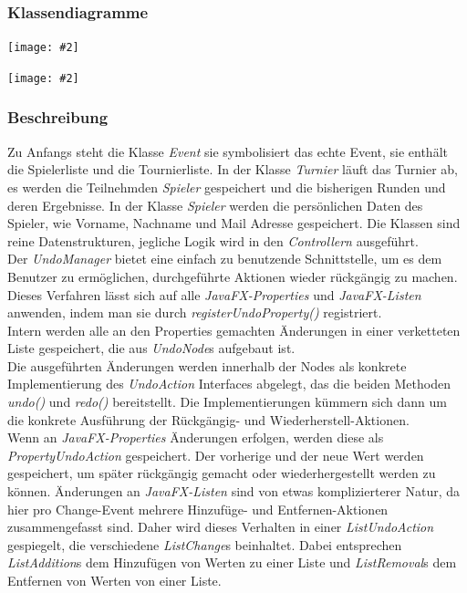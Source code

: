\documentclass[11pt]{article}
\newcommand{\includediagram}[2]{
	\begin{center}
		\texttt{[image: \#2]}
	\end{center}
}
\begin{document}
\subsubsection{Klassendiagramme}

\includediagram{1.0}{model-main.png}

\includediagram{1.0}{model-undo.png}

\subsubsection{Beschreibung}
Zu Anfangs steht die Klasse \textit{Event} sie symbolisiert das echte Event, sie enthält die Spielerliste und die Tournierliste. In der Klasse \textit{Turnier} läuft das Turnier ab, es werden die Teilnehmden \textit{Spieler} gespeichert und die bisherigen Runden und deren Ergebnisse. In der Klasse \textit{Spieler} werden die persönlichen Daten des Spieler, wie Vorname, Nachname und Mail Adresse gespeichert. Die Klassen sind reine Datenstrukturen, jegliche Logik wird in den \textit{Controllern} ausgeführt.\\
Der \textit{UndoManager} bietet eine einfach zu benutzende Schnittstelle, um es dem Benutzer zu ermöglichen, durchgeführte Aktionen wieder rückgängig zu machen. Dieses Verfahren lässt sich auf alle \textit{JavaFX-Properties} und \textit{JavaFX-Listen} anwenden, indem man sie durch \textit{registerUndoProperty()} registriert.\\
Intern werden alle an den Properties gemachten Änderungen in einer verketteten Liste gespeichert, die aus \textit{UndoNode}s aufgebaut ist.\\
Die ausgeführten Änderungen werden innerhalb der Nodes als konkrete Implementierung des \textit{UndoAction} Interfaces abgelegt, das die beiden Methoden \textit{undo()} und \textit{redo()} bereitstellt. Die Implementierungen kümmern sich dann um die konkrete Ausführung der Rückgängig- und Wiederherstell-Aktionen.\\
Wenn an \textit{JavaFX-Properties} Änderungen erfolgen, werden diese als \textit{PropertyUndoAction} gespeichert. Der vorherige und der neue Wert werden gespeichert, um später rückgängig gemacht oder wiederhergestellt werden zu können.
Änderungen an \textit{JavaFX-Listen} sind von etwas komplizierterer Natur, da hier pro Change-Event mehrere Hinzufüge- und Entfernen-Aktionen zusammengefasst sind. Daher wird dieses Verhalten in einer \textit{ListUndoAction} gespiegelt, die verschiedene \textit{ListChange}s beinhaltet. Dabei entsprechen \textit{ListAddition}s dem Hinzufügen von Werten zu einer Liste und \textit{ListRemoval}s dem Entfernen von Werten von einer Liste.
\end{document}

